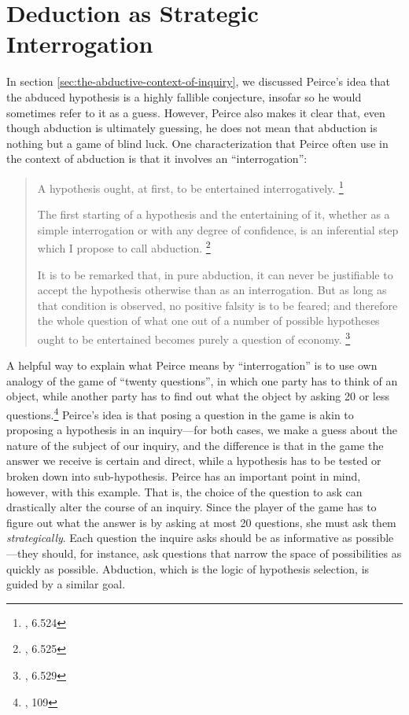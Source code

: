 \section{Deduction as Strategic Interrogation}\label{strategicint}

In section \ref{sec:the-abductive-context-of-inquiry}, we discussed Peirce's idea that the abduced hypothesis is a highly fallible conjecture, insofar so he would sometimes refer to it as a guess. However, Peirce also makes it clear that, even though abduction is ultimately guessing, he does not mean that abduction is nothing but a game of blind luck. One characterization that Peirce often use in the context of abduction is that it involves an ``interrogation'':

\begin{quote}
	A hypothesis ought, at first, to be entertained interrogatively. \footnote{\cite{CP}, 6.524}
	
	The first starting of a hypothesis and the entertaining of it, whether as a simple interrogation or with any degree of confidence, is an inferential step which I propose to call abduction.	 \footnote{\cite{CP}, 6.525}
	
	It is to be remarked that, in pure abduction, it can never be justifiable to accept the hypothesis otherwise than as an interrogation. But as long as that condition is observed, no positive falsity is to be feared; and therefore the whole question of what one out of a number of possible hypotheses ought to be entertained becomes purely a question of economy.	\footnote{\cite{CP}, 6.529}
\end{quote}

A helpful way to explain what Peirce means by ``interrogation'' is to use own analogy of the game of ``twenty questions'', in which one party has to think of an object, while another party has to find out what the object by asking 20 or less questions.\footnote{\cite{essentialpeirce2}, 109} Peirce's idea is that posing a question in the game is akin to proposing a hypothesis in an inquiry---for both cases, we make a guess about the nature of the subject of our inquiry, and the difference is that in the game the answer we receive is certain and direct, while a hypothesis has to be tested or broken down into sub-hypothesis. Peirce has an important point in mind, however, with this example. That is, the choice of the question to ask can drastically alter the course of an inquiry. Since the player of the game has to figure out what the answer is by asking at most 20 questions, she must ask them \emph{strategically}. Each question the inquire asks should be as informative as possible---they should, for instance, ask questions that narrow the space of possibilities as quickly as possible. Abduction, which is the logic of hypothesis selection, is guided by a similar goal.

